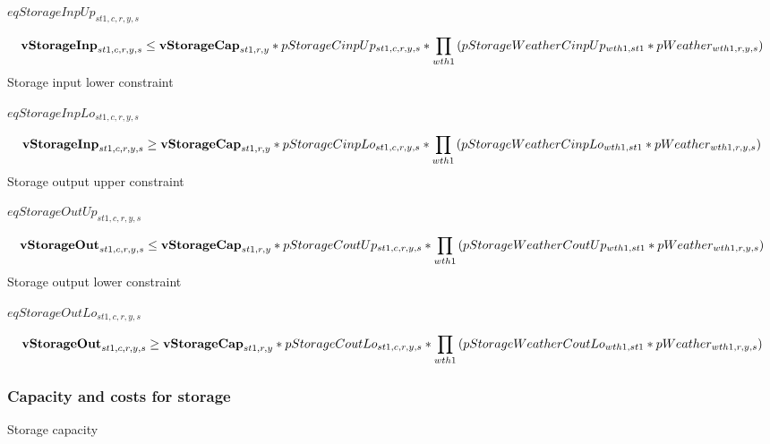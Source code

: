 \documentclass{article}
\begin{document}
$eqStorageInpUp_{st1,c,r,y,s}$





\begin{dmath} 
{\bf vStorageInp}_{st1,c,r,y,s}  \le  {\bf vStorageCap}_{st1,r,y}*pStorageCinpUp_{st1,c,r,y,s}*\prod_{wth1}{\left(pStorageWeatherCinpUp_{wth1,st1}*pWeather_{wth1,r,y,s}\right)}
\end{dmath} 
Storage input lower constraint







$eqStorageInpLo_{st1,c,r,y,s}$





\begin{dmath} 
{\bf vStorageInp}_{st1,c,r,y,s}  \ge  {\bf vStorageCap}_{st1,r,y}*pStorageCinpLo_{st1,c,r,y,s}*\prod_{wth1}{\left(pStorageWeatherCinpLo_{wth1,st1}*pWeather_{wth1,r,y,s}\right)}
\end{dmath} 
Storage output upper constraint







$eqStorageOutUp_{st1,c,r,y,s}$





\begin{dmath} 
{\bf vStorageOut}_{st1,c,r,y,s}  \le  {\bf vStorageCap}_{st1,r,y}*pStorageCoutUp_{st1,c,r,y,s}*\prod_{wth1}{\left(pStorageWeatherCoutUp_{wth1,st1}*pWeather_{wth1,r,y,s}\right)}
\end{dmath} 
Storage output lower constraint







$eqStorageOutLo_{st1,c,r,y,s}$





\begin{dmath} 
{\bf vStorageOut}_{st1,c,r,y,s}  \ge  {\bf vStorageCap}_{st1,r,y}*pStorageCoutLo_{st1,c,r,y,s}*\prod_{wth1}{\left(pStorageWeatherCoutLo_{wth1,st1}*pWeather_{wth1,r,y,s}\right)}
\end{dmath} 
\subsubsection*{Capacity and costs for storage}
Storage capacity
\end{document}
